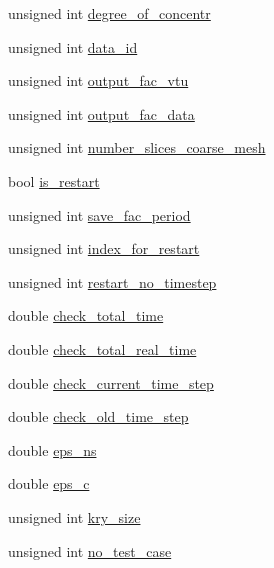 \begin{DoxyCompactItemize}
\item 
unsigned int \hyperlink{struct_u_b_c__mis__mixing_1_1_parameters_a8f1bf5db819f09c9175a8bd7bf484971}{degree\+\_\+of\+\_\+concentr}
\item 
unsigned int \hyperlink{struct_u_b_c__mis__mixing_1_1_parameters_afefc28070f4288b949598723654baba4}{data\+\_\+id}
\item 
unsigned int \hyperlink{struct_u_b_c__mis__mixing_1_1_parameters_aa8503b9797f46dc16ba0fa2d7195a48f}{output\+\_\+fac\+\_\+vtu}
\item 
unsigned int \hyperlink{struct_u_b_c__mis__mixing_1_1_parameters_a5f77aeaec6daafeb048c81f8a422736d}{output\+\_\+fac\+\_\+data}
\item 
unsigned int \hyperlink{struct_u_b_c__mis__mixing_1_1_parameters_afd0d62eb8370ef34626e5ee3dac0e3a8}{number\+\_\+slices\+\_\+coarse\+\_\+mesh}
\item 
bool \hyperlink{struct_u_b_c__mis__mixing_1_1_parameters_a31244f6049cfffcb0f4bf5a80e2dcd5c}{is\+\_\+restart}
\item 
unsigned int \hyperlink{struct_u_b_c__mis__mixing_1_1_parameters_abdf2cfe7ef4efe3987f24f486cbbb368}{save\+\_\+fac\+\_\+period}
\item 
unsigned int \hyperlink{struct_u_b_c__mis__mixing_1_1_parameters_a59c23712227d6670b7e9d89e11a4ee04}{index\+\_\+for\+\_\+restart}
\item 
unsigned int \hyperlink{struct_u_b_c__mis__mixing_1_1_parameters_a1d34bd766f4ab94c96e72c8492f4f14e}{restart\+\_\+no\+\_\+timestep}
\item 
double \hyperlink{struct_u_b_c__mis__mixing_1_1_parameters_a489c02b628933ffd13120097d0f03f46}{check\+\_\+total\+\_\+time}
\item 
double \hyperlink{struct_u_b_c__mis__mixing_1_1_parameters_aaf644b08843115cd70c280ae7c00f252}{check\+\_\+total\+\_\+real\+\_\+time}
\item 
double \hyperlink{struct_u_b_c__mis__mixing_1_1_parameters_a233d28122449f3e894af1b5eb8cda925}{check\+\_\+current\+\_\+time\+\_\+step}
\item 
double \hyperlink{struct_u_b_c__mis__mixing_1_1_parameters_a073ad4dff68ff33bc25e01f21401958b}{check\+\_\+old\+\_\+time\+\_\+step}
\item 
double \hyperlink{struct_u_b_c__mis__mixing_1_1_parameters_a59539a74b2a7b5ada31dbb529ff21d9f}{eps\+\_\+ns}
\item 
double \hyperlink{struct_u_b_c__mis__mixing_1_1_parameters_a1d20b15ac5ae8fb61fab2027e003b010}{eps\+\_\+c}
\item 
unsigned int \hyperlink{struct_u_b_c__mis__mixing_1_1_parameters_adfd3cf708a892fea49d74dc2da238197}{kry\+\_\+size}
\item 
unsigned int \hyperlink{struct_u_b_c__mis__mixing_1_1_parameters_a958199fa5ce0d11d18572bbcc5dc3853}{no\+\_\+test\+\_\+case}
\end{DoxyCompactItemize}



